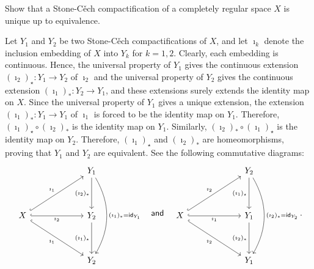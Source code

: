 \begin{prob}
    Show that a Stone-C\v{e}ch compactification of a completely regular space $X$ is unique up to equivalence.
\end{prob}
\begin{sol}
    Let $Y_1$ and $Y_2$ be two Stone-C\v{e}ch compactifications of $X$, and let $\imath_k$ denote the inclusion embedding of $X$ into $Y_k$ for $k=1, 2$.
    Clearly, each embedding is continuous.
    Hence, the universal property of $Y_1$ gives the continuous extension $(\imath_2)_\star: Y_1\rightarrow Y_2$ of $\imath_2$ and the universal property of $Y_2$ gives the continuous extension $(\imath_1)_*: Y_2\rightarrow Y_1$, and these extensions surely extends the identity map on $X$.
    Since the universal property of $Y_1$ gives a unique extension, the extension $(\imath_1)_*: Y_1\rightarrow Y_1$ of $\imath_1$ is forced to be the identity map on $Y_1$.
    Therefore, $(\imath_1)_\star\circ(\imath_2)_*$ is the identity map on $Y_1$.
    Similarly, $(\imath_2)_*\circ(\imath_1)_\star$ is the identity map on $Y_2$.
    Therefore, $(\imath_1)_\star$ and $(\imath_2)_*$ are homeomorphisms, proving that $Y_1$ and $Y_2$ are equivalent.
    See the following commutative diagrams:
    \begin{equation*}
    \begin{tikzcd}[row sep=1.3cm, column sep=2.2cm]
        & Y_1\arrow[d, "(\imath_2)_*"']\arrow[dd, bend left, "(\imath_1)_*=\textsf{id}_{Y_1}"]\\
        X
        \arrow[ur, "\imath_1", hook]
        \arrow[r, "\imath_2"', hook]
        \arrow[dr, "\imath_1"', hook]
        & Y_2\arrow[d, "(\imath_1)_\star"']\\
        & Y_2
    \end{tikzcd}\quad
    \textsf{and}\quad
    \begin{tikzcd}[row sep=1.3cm, column sep=2.2cm]
        & Y_2\arrow[d, "(\imath_1)_\star"']\arrow[dd, bend left, "(\imath_2)_\star=\textsf{id}_{Y_2}"]\\
        X
        \arrow[ur, "\imath_2", hook]
        \arrow[r, "\imath_1"', hook]
        \arrow[dr, "\imath_2"', hook]
        & Y_1\arrow[d, "(\imath_2)_*"']\\
        & Y_1
    \end{tikzcd}.
    \end{equation*}
\end{sol}